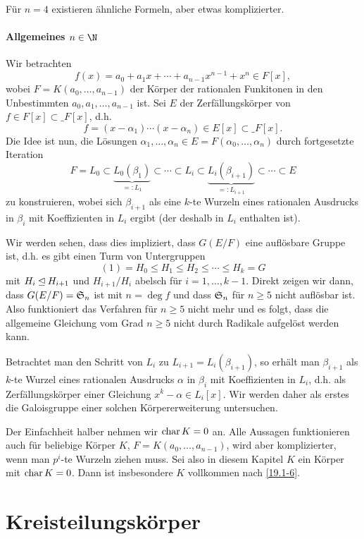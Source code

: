 Für $n = 4$ existieren ähnliche Formeln, aber etwas komplizierter.

\paragraph{Allgemeines $n \in \N$}

Wir betrachten
\[
	f(x) = a_0 + a_1 x + \dotsb + a_{n-1} x^{n-1} + x^n \in F[x],
\]
wobei $F = K(a_0, \dotsc, a_{n-1})$ der Körper der rationalen Funkitonen in den Unbestimmten $a_0, a_1, \dotsc, a_{n-1}$ ist.
Sei $E$ der Zerfällungskörper von $f \in F[x] \subset \_F[x]$, d.h.
\[
	f = (x-\alpha_1) \dotsb (x-\alpha_n) \in E[x] \subset \_F[x].
\]
Die Idee ist nun, die Lösungen $\alpha_1, \dotsc, \alpha_n \in E = F(\alpha_0, \dotsc, \alpha_n)$ durch fortgesetzte Iteration
\[
	F = L_0 \subset \underbrace{L_0 (\beta_1)}_{=:L_1} \subset \dotsb \subset L_i \subset \underbrace{L_i(\beta_{i+1})}_{=:L_{i+1}} \subset \dotsb \subset E
\]
zu konstruieren, wobei sich $\beta_{i+1}$ als eine $k$-te Wurzeln eines rationalen Ausdrucks in $\beta_i$ mit Koeffizienten in $L_i$ ergibt (der deshalb in $L_i$ enthalten ist).

Wir werden sehen, dass dies impliziert, dass $G(E / F)$ eine auflösbare Gruppe ist, d.h. es gibt einen Turm von Untergruppen
\[
	(1) = H_0 \le H_1 \le H_2 \le \dotsb \le H_k = G
\]
mit $H_i \Idealof H_{i+1}$ und $H_{i+1} / H_i$ abelsch für $i = 1, \dotsc, k-1$.
Direkt zeigen wir dann, dass $G(E / F) = \S_n$ ist mit $n = \deg f$ und dass $\S_n$ für $n \ge 5$ nicht auflösbar ist.
Also funktioniert das Verfahren für $n \ge 5$ nicht mehr und es folgt, dass die allgemeine Gleichung vom Grad $n \ge 5$ nicht durch Radikale aufgelöst werden kann.

Betrachtet man den Schritt von $L_i$ zu $L_{i+1} = L_i(\beta_{i+1})$, so erhält man $\beta_{i+1}$ als $k$-te Wurzel eines rationalen Ausdrucks $\alpha$ in $\beta_i$ mit Koeffizienten in $L_i$, d.h. als Zerfällungskörper einer Gleichung $x^k - \alpha \in L_i[x]$.
Wir werden daher als erstes die Galoisgruppe einer solchen Körpererweiterung untersuchen.

Der Einfachheit halber nehmen wir $\Char K = 0$ an.
Alle Aussagen funktionieren auch für beliebige Körper $K$, $F = K(a_0, \dotsc, a_{n-1})$, wird aber komplizierter, wenn man $p^i$-te Wurzeln ziehen muss.
Sei also in diesem Kapitel $K$ ein Körper mit $\Char K = 0$.
Dann ist insbesondere $K$ vollkommen nach \ref{19.1-6}.


\section{Kreisteilungskörper}

